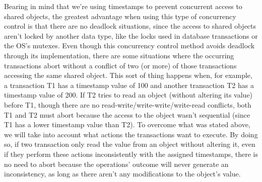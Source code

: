 \documentclass[times, 10pt,twocolumn]{article}
\begin{document}






Bearing in mind that we're using timestamps to prevent concurrent access to shared objects, the greatest advantage when using this type of concurrency control is that there are no deadlock situations, since the access to shared objects aren't locked by another data type, like the locks used in database transactions or the OS's mutexes.
Even though this concurrency control method avoids deadlock through its implementation, there are some situations where the occurring transactions abort without a conflict of two (or more) of those transactions accessing the same shared object. This sort of thing happens when, for example, a transaction T1 has a timestamp value of 100 and another transaction T2 has a timestamp value of 200. If T2 tries to read an object (without altering its value) before T1, though there are no read-write/write-write/write-read conflicts, both T1 and T2 must abort because the access to the object wasn't sequential (since T1 has a lower timestamp value than T2).
To overcome what was stated above, we will take into account what actions the transactions want to execute. By doing so, if two transaction only read the value from an object without altering it, even if they perform these actions inconsistently with the assigned timestamps, there is no need to abort because the operations' outcome will never generate an inconsistency, as long as there aren't any modifications to the object's value.





\end{document}
